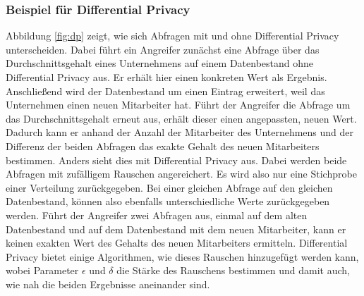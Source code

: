 \subsubsection*{Beispiel für Differential Privacy}

Abbildung \ref{fig:dp} zeigt, wie sich Abfragen mit und ohne Differential Privacy unterscheiden.
Dabei führt ein Angreifer zunächst eine Abfrage über das Durchschnittsgehalt eines Unternehmens auf einem Datenbestand ohne Differential Privacy aus. 
Er erhält hier einen konkreten Wert als Ergebnis.
Anschließend wird der Datenbestand um einen Eintrag erweitert, weil das Unternehmen einen neuen Mitarbeiter hat.
Führt der Angreifer die Abfrage um das Durchschnittsgehalt erneut aus, erhält dieser einen angepassten, neuen Wert.
Dadurch kann er anhand der Anzahl der Mitarbeiter des Unternehmens und der Differenz der beiden Abfragen das exakte Gehalt des neuen Mitarbeiters bestimmen.
Anders sieht dies mit Differential Privacy aus. 
Dabei werden beide Abfragen mit zufälligem Rauschen angereichert. 
Es wird also nur eine Stichprobe einer Verteilung zurückgegeben. 
Bei einer gleichen Abfrage auf den gleichen Datenbestand, können also ebenfalls unterschiedliche Werte zurückgegeben werden.
Führt der Angreifer zwei Abfragen aus, einmal auf dem alten Datenbestand und auf dem Datenbestand mit dem neuen Mitarbeiter, kann er keinen exakten Wert des Gehalts des neuen Mitarbeiters ermitteln.
Differential Privacy bietet einige Algorithmen, wie dieses Rauschen hinzugefügt werden kann, wobei Parameter $\epsilon$ und $\delta$ die Stärke des Rauschens bestimmen und damit auch, wie nah die beiden Ergebnisse aneinander sind.

